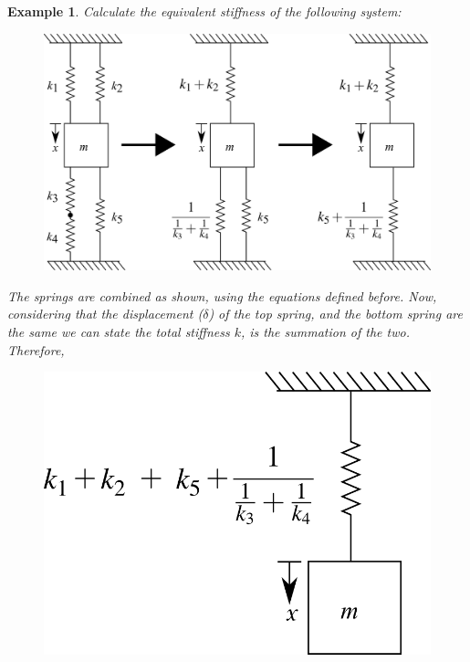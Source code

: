 \documentclass[12pt,letter]{article}
\newtheorem{ex}{Example}
\numberwithin{ex}{section} %
\newenvironment{example}{\begin{mdframed}[middlelinewidth=0.5mm]\begin{ex}\normalfont}{\end{ex}\end{mdframed}}
\numberwithin{re}{section} %
\numberwithin{vcs}{section} %
\begin{document}
			\begin{example}

				Calculate the equivalent stiffness of the following system:
				\begin{figure}[H]
					\centering
					\includegraphics[]{../figures/equivalent_mass_and_spring_system_1.png}
				\end{figure}	
				The springs are combined as shown, using the equations defined before.  Now, considering that the displacement ($\delta$) of the top spring, and the bottom spring are the same we can state the total stiffness $k$, is the summation of the two. Therefore,    
				\begin{figure}[H]
					\centering
					\includegraphics[]{../figures/equivalent_mass_and_spring_system_2.png}
				\end{figure}	

\end{example}
\end{document}
